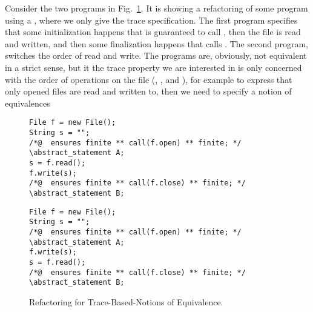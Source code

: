 Consider the two programs in Fig.~\ref{fig:sth}. It is showing a refactoring of some program using a , where we only give the trace specification.
The first program specifies that some initialization happens that is guaranteed to call , then the file is read and written,
and then some finalization happens that calls . The second program, switches the order of read and write.
The programs are, obviously, not equivalent in a strict sense, but it the trace property we are interested in is only concerned with the order of operations on the file 
(, ,  and ), for example to express that only opened files are read and written to, then we need to specify a notion of equivalences


\begin{figure}
\begin{lstlisting}[style=refinity]
File f = new File();
String s = "";
/*@  ensures finite ** call(f.open) ** finite; */
\abstract_statement A;     
s = f.read();
f.write(s);
/*@  ensures finite ** call(f.close) ** finite; */
\abstract_statement B;     
\end{lstlisting}
\begin{lstlisting}[style=refinity]
File f = new File();
String s = "";
/*@  ensures finite ** call(f.open) ** finite; */
\abstract_statement A;     
f.write(s);
s = f.read();
/*@  ensures finite ** call(f.close) ** finite; */
\abstract_statement B;     
\end{lstlisting}
\caption{Refactoring for Trace-Based-Notions of Equivalence.}
\label{fig:sth}
\end{figure}







